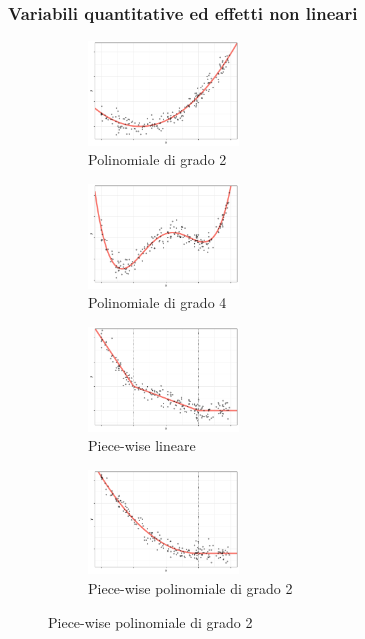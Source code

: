 \documentclass[pdf, aspectratio=169, xcolor=dvipsnames]{beamer}\usepackage[]{graphicx}\usepackage[]{color}
\theoremstyle{definition}
\begin{document}
\begin{frame}
\frametitle{Variabili quantitative ed effetti non lineari}

\fontsize{9pt}{11pt}\selectfont

\begin{figure}
  \centering
  \begin{subfigure}[b]{4.8cm}
    \centering
    \caption{Polinomiale di grado 2}
    \includegraphics[width=4cm]{_bookdown_files/_main_files/figure-latex/expl-var-quant-effect-1.pdf}
  \end{subfigure}
  \qquad
  \begin{subfigure}[b]{4.8cm}
    \centering
    \caption{Polinomiale di grado 4}
    \includegraphics[width=4cm]{_bookdown_files/_main_files/figure-latex/expl-var-quant-effect-2.pdf}
  \end{subfigure}
  \par\medskip
  \begin{subfigure}[b]{4.8cm}
    \centering
    \caption{Piece-wise lineare}
    \includegraphics[width=4cm]{_bookdown_files/_main_files/figure-latex/expl-var-quant-effect-3.pdf}
  \end{subfigure}
  \qquad
  \begin{subfigure}[b]{4.8cm}
    \centering
    \caption{Piece-wise polinomiale di grado 2}
    \includegraphics[width=4cm]{_bookdown_files/_main_files/figure-latex/expl-var-quant-effect-4.pdf}
  \end{subfigure}
\end{figure}

\end{frame}
\end{document}
